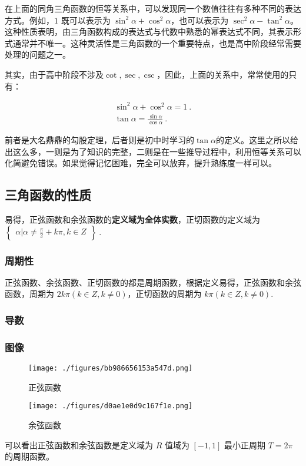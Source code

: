 在上面的同角三角函数的恒等关系中，可以发现同一个数值往往有多种不同的表达方式。例如，$1$ 既可以表示为 $\sin^2\alpha+\cos^2\alpha$，也可以表示为 $\sec^2\alpha-\tan^2\alpha$。这种性质表明，由三角函数构成的表达式与代数中熟悉的幂表达式不同，其表示形式通常并不唯一。这种灵活性是三角函数的一个重要特点，也是高中阶段经常需要处理的问题之一。

其实，由于高中阶段不涉及$\cot,\sec,\csc$，因此，上面的关系中，常常使用的只有：

\begin{gather}
\sin ^{2} \alpha + \cos ^{2}\alpha =1~.\\
\tan \alpha= \frac{\sin \alpha}{\cos \alpha}~.
\end{gather}

前者是大名鼎鼎的勾股定理，后者则是初中时学习的$\tan\alpha$的定义。这里之所以给出这么多，一则是为了知识的完整，二则是在一些推导过程中，利用恒等关系可以化简避免错误。如果觉得记忆困难，完全可以放弃，提升熟练度一样可以。

\subsection{三角函数的性质}
易得，正弦函数和余弦函数的\textbf{定义域为全体实数}，正切函数的定义域为 $\begin{Bmatrix}\alpha|\alpha \neq \frac{\pi}{2}+k\pi,k\in Z\end{Bmatrix}~.$
\subsubsection{周期性}
正弦函数、余弦函数、正切函数的都是周期函数，根据定义易得，正弦函数和余弦函数，周期为 $2k\pi(k\in Z,k\neq0)$，正切函数的周期为 $k\pi(k\in Z,k\neq0)$.
\subsubsection{导数}

\subsubsection{图像}

\begin{figure}[ht]
\centering
\texttt{[image: ./figures/bb986656153a547d.png]}
\caption{正弦函数} \label{fig_HsTrFu_1}
\end{figure}
\begin{figure}[ht]
\centering
\texttt{[image: ./figures/d0ae1e0d9c167f1e.png]}
\caption{余弦函数} \label{fig_HsTrFu_2}
\end{figure}
可以看出正弦函数和余弦函数是定义域为 $R$ 值域为 $[-1,1]$ 最小正周期 $T = 2\pi$ 的周期函数。
